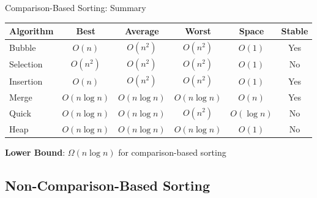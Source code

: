 \documentclass[aspectratio=169,xcolor=dvipsnames]{beamer}
\begin{document}
\begin{frame}{Comparison-Based Sorting: Summary}
  \begin{table}
    \centering
    \small
    \begin{tabular}{lccccc}
      \hline
      \textbf{Algorithm} & \textbf{Best} & \textbf{Average} & \textbf{Worst} & \textbf{Space} & \textbf{Stable} \\
      \hline
      Bubble & $O(n)$ & $O(n^2)$ & $O(n^2)$ & $O(1)$ & Yes \\
      Selection & $O(n^2)$ & $O(n^2)$ & $O(n^2)$ & $O(1)$ & No \\
      Insertion & $O(n)$ & $O(n^2)$ & $O(n^2)$ & $O(1)$ & Yes \\
      Merge & $O(n \log n)$ & $O(n \log n)$ & $O(n \log n)$ & $O(n)$ & Yes \\
      Quick & $O(n \log n)$ & $O(n \log n)$ & $O(n^2)$ & $O(\log n)$ & No \\
      Heap & $O(n \log n)$ & $O(n \log n)$ & $O(n \log n)$ & $O(1)$ & No \\
      \hline
    \end{tabular}
  \end{table}

  \vspace{0.3cm}
  \textbf{Lower Bound}: $\Omega(n \log n)$ for comparison-based sorting
\end{frame}

\subsection{Non-Comparison-Based Sorting}
\end{document}
